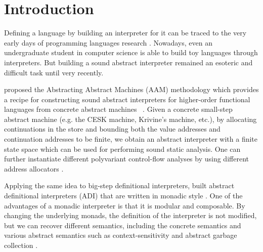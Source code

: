 \documentclass[acmsmall]{acmart}\settopmatter{}
\begin{document}


\maketitle


\section{Introduction}

Defining a language by building an interpreter for it can be traced to the very
early days of programming languages research \cite{landin1966next, Reynolds:72}.
Nowadays, even an undergraduate student in computer science is able to build toy 
languages through interpreters.
But building a sound abstract interpreter remained an esoteric and difficult task 
until very recently.

\citeauthor{van2012systematic} proposed the Abstracting Abstract Machines (AAM) 
methodology which provides a recipe for constructing sound abstract interpreters 
for higher-order functional languages from concrete abstract machines 
~\cite{van2012systematic, van2010abstracting}.
Given a concrete small-step abstract machine (e.g. the CESK machine, Krivine's 
machine, etc.), by allocating continuations in the store and bounding both the 
value addresses and continuation addresses to be finite, we obtain an abstract 
interpreter with a finite state space which can be used for performing sound 
static analysis.
One can further instantiate different polyvariant control-flow analyses by using
different address allocators \cite{Gilray:2016:ACP:2951913.2951936}.

Applying the same idea to big-step definitional interpreters, \citeauthor{darais2017abstracting}
built abstract definitional interpreters (ADI) that are written in monadic style 
\cite{darais2017abstracting}. One of the advantages of a monadic interpreter is 
that it is modular and composable. By changing the underlying monads, the definition
of the interpreter is not modified, but we can recover different semantics, including
the concrete semantics and various abstract semantics such as context-sensitivity and
abstract garbage collection \cite{Sergey:2013:MAI:2491956.2491979}.
\end{document}
